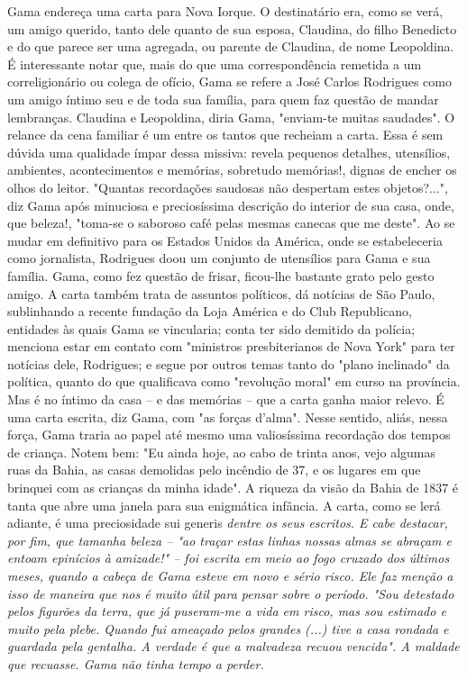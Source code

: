 {\small\noindent
Gama endereça uma carta para Nova Iorque. O destinatário era, como
se verá, um amigo querido, tanto dele quanto de sua esposa, Claudina, do
filho Benedicto e do que parece ser uma agregada, ou parente de
Claudina, de nome Leopoldina. É interessante notar que, mais do que uma
correspondência remetida a um correligionário ou colega de ofício, Gama
se refere a José Carlos Rodrigues como um amigo íntimo seu e de toda sua
família, para quem faz questão de mandar lembranças. Claudina e
Leopoldina, diria Gama, "enviam-te muitas saudades". O relance da cena
familiar é um entre os tantos que recheiam a carta. Essa é sem dúvida
uma qualidade ímpar dessa missiva: revela pequenos detalhes, utensílios,
ambientes, acontecimentos e memórias, sobretudo memórias!, dignas de
encher os olhos do leitor. "Quantas recordações saudosas não despertam
estes objetos?...", diz Gama após minuciosa e preciosíssima descrição do
interior de sua casa, onde, que beleza!, "toma-se o saboroso café pelas
mesmas canecas que me deste". Ao se mudar em definitivo para os Estados
Unidos da América, onde se estabeleceria como jornalista, Rodrigues doou
um conjunto de utensílios para Gama e sua família. Gama, como fez
questão de frisar, ficou-lhe bastante grato pelo gesto amigo. A carta
também trata de assuntos políticos, dá notícias de São Paulo,
sublinhando a recente fundação da Loja América e do Club Republicano,
entidades às quais Gama se vincularia; conta ter sido demitido da
polícia; menciona estar em contato com "ministros presbiterianos de Nova
York" para ter notícias dele, Rodrigues; e segue por outros temas tanto
do "plano inclinado" da política, quanto do que qualificava como
"revolução moral" em curso na província. Mas é no íntimo da casa -- e
das memórias -- que a carta ganha maior relevo. É uma carta escrita, diz
Gama, com "as forças d'alma". Nesse sentido, aliás, nessa força, Gama
traria ao papel até mesmo uma valiosíssima recordação dos tempos de
criança. Notem bem: "Eu ainda hoje, ao cabo de trinta anos, vejo algumas
ruas da Bahia, as casas demolidas pelo incêndio de 37, e os lugares em
que brinquei com as crianças da minha idade". A riqueza da visão da
Bahia de 1837 é tanta que abre uma janela para sua enigmática infância.
A carta, como se lerá adiante, é uma preciosidade} sui generis
\emph{dentre os seus escritos. E cabe destacar, por fim, que tamanha
beleza -- "ao traçar estas linhas nossas almas se abraçam e entoam
epinícios à amizade!" -- foi escrita em meio ao fogo cruzado dos últimos
meses, quando a cabeça de Gama esteve em novo e sério risco. Ele faz
menção a isso de maneira que nos é muito útil para pensar sobre o
período. "Sou detestado pelos figurões da terra, que já puseram-me a
vida em risco, mas sou estimado e muito pela plebe. Quando fui ameaçado
pelos grandes (...) tive a casa rondada e guardada pela gentalha. A
verdade é que a malvadeza recuou vencida". A maldade que recuasse. Gama
não tinha tempo a perder.}

